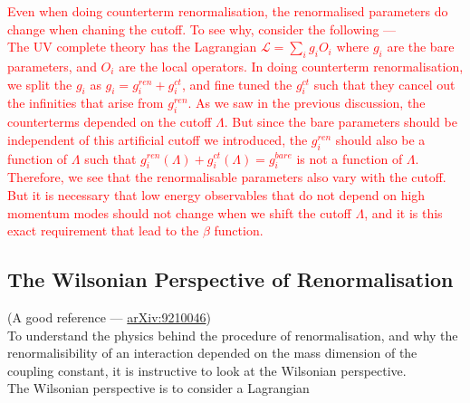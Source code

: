 \documentclass[11pt]{article}
\newcommand{\ld}{\mathcal{L}}
\numberwithin{equation}{section}
\begin{document}
\textcolor{red}{
    Even when doing counterterm renormalisation, the renormalised parameters do change when chaning the cutoff. To see why, consider the following —\\
    The UV complete theory has the Lagrangian \(\ld = \sum_i g_i O_i\) where \(g_i\) are the bare parameters, and \(O_i\) are the local operators. In doing counterterm renormalisation, we split the \(g_i\) as \(g_i = g_i^{ren} + g_i^{ct}\), and fine tuned the \(g_i^{ct}\) such that they cancel out the infinities that arise from \(g_i^{ren}\). As we saw in the previous discussion, the counterterms depended on the cutoff \(\Lambda\). But since the bare parameters should be independent of this artificial cutoff we introduced, the \(g_i^{ren}\) should also be a function of \(\Lambda\) such that \(g_i^{ren}(\Lambda) + g_i^{ct}(\Lambda) = g_i^{bare}\) is not a function of \(\Lambda\). Therefore, we see that the renormalisable parameters also vary with the cutoff. But it is necessary that low energy observables that do not depend on high momentum modes should not change when we shift the cutoff \(\Lambda\), and it is this exact requirement that lead to the \(\beta\) function.
}




\subsection{The Wilsonian Perspective of Renormalisation}
(A good reference — \href{https://arxiv.org/abs/hep-th/9210046}{arXiv:9210046})\\

To understand the physics behind the procedure of renormalisation, and why the renormalisibility of an interaction depended on the mass dimension of the coupling constant, it is instructive to look at the Wilsonian perspective.\\

The Wilsonian perspective is to consider a Lagrangian 
\end{document}
